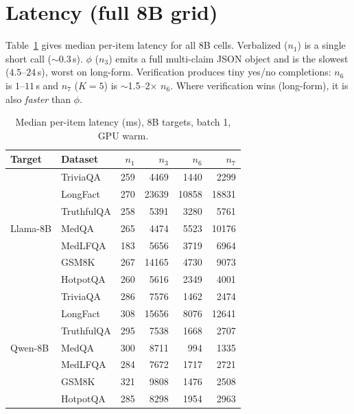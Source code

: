 \documentclass[11pt]{article}
\newcommand{\nverb}{$n_1$}     %
\newcommand{\nphi}{$n_3$}      %
\newcommand{\nyn}{$n_6$}       %
\newcommand{\nsc}{$n_7$}       %
\begin{document}
\section{Latency (full 8B grid)}\label{app:latency}
Table~\ref{tab:latfull} gives median per-item latency for all 8B cells. Verbalized ($n_1$) is a
single short call ($\sim$0.3\,s). $\phi$ ($n_3$) emits a full multi-claim JSON object and is the
slowest ($4.5$--$24$\,s), worst on long-form. Verification produces tiny yes/no completions:
$n_6$ is $1$--$11$\,s and $n_7$ ($K{=}5$) is $\sim$1.5--2$\times$ $n_6$. Where verification wins
(long-form), it is also \emph{faster} than $\phi$.
\begin{table}[h]
\centering\small
\setlength{\tabcolsep}{4pt}
\begin{tabular}{llrrrr}
\toprule
Target & Dataset & \nverb & \nphi & \nyn & \nsc \\
\midrule
\multirow{7}{*}{Llama-8B}
 & TriviaQA & 259 & 4469 & 1440 & 2299 \\
 & LongFact & 270 & 23639 & 10858 & 18831 \\
 & TruthfulQA & 258 & 5391 & 3280 & 5761 \\
 & MedQA & 265 & 4474 & 5523 & 10176 \\
 & MedLFQA & 183 & 5656 & 3719 & 6964 \\
 & GSM8K & 267 & 14165 & 4730 & 9073 \\
 & HotpotQA & 260 & 5616 & 2349 & 4001 \\
\midrule
\multirow{7}{*}{Qwen-8B}
 & TriviaQA & 286 & 7576 & 1462 & 2474 \\
 & LongFact & 308 & 15656 & 8076 & 12641 \\
 & TruthfulQA & 295 & 7538 & 1668 & 2707 \\
 & MedQA & 300 & 8711 & 994 & 1335 \\
 & MedLFQA & 284 & 7672 & 1717 & 2721 \\
 & GSM8K & 321 & 9808 & 1476 & 2508 \\
 & HotpotQA & 285 & 8298 & 1954 & 2963 \\
\bottomrule
\end{tabular}
\caption{Median per-item latency (ms), 8B targets, batch 1, GPU warm.}
\label{tab:latfull}
\end{table}
\end{document}
